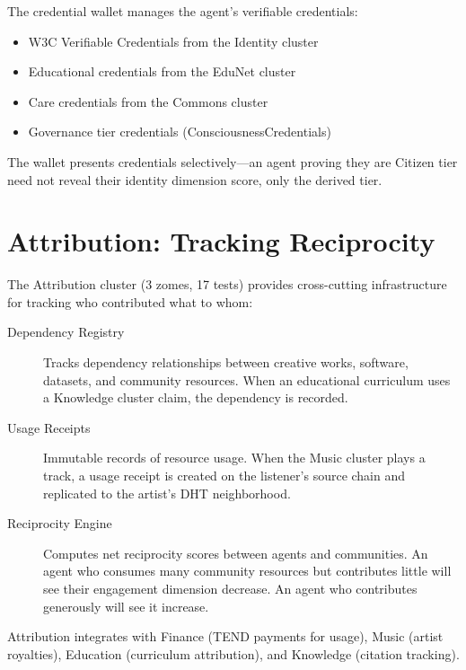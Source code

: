 \documentclass[12pt]{book}
\begin{document}
The credential wallet manages the agent's verifiable credentials:

\begin{itemize}
  \item W3C Verifiable Credentials from the Identity cluster
  \item Educational credentials from the EduNet cluster
  \item Care credentials from the Commons cluster
  \item Governance tier credentials (ConsciousnessCredentials)
\end{itemize}

The wallet presents credentials selectively---an agent proving they are
Citizen tier need not reveal their identity dimension score, only the derived
tier.

\section{Attribution: Tracking Reciprocity}

The Attribution cluster (3 zomes, 17 tests) provides cross-cutting
infrastructure for tracking who contributed what to whom:

\begin{description}
  \item[Dependency Registry] Tracks dependency relationships between
    creative works, software, datasets, and community resources.
    When an educational curriculum uses a Knowledge cluster claim,
    the dependency is recorded.
  \item[Usage Receipts] Immutable records of resource usage. When the
    Music cluster plays a track, a usage receipt is created on the
    listener's source chain and replicated to the artist's DHT neighborhood.
  \item[Reciprocity Engine] Computes net reciprocity scores between
    agents and communities. An agent who consumes many community
    resources but contributes little will see their engagement dimension
    decrease. An agent who contributes generously will see it increase.
\end{description}

Attribution integrates with Finance (TEND payments for usage), Music (artist
royalties), Education (curriculum attribution), and Knowledge (citation
tracking).


\end{document}
